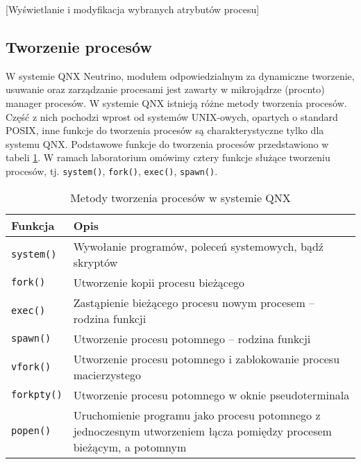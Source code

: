 \begin{example}{[Wyświetlanie i modyfikacja wybranych atrybutów procesu]}
  \label{ex:TEPBG}
  
\end{example}


\subsection{Tworzenie procesów}

W systemie QNX Neutrino, modułem odpowiedzialnym za dynamiczne tworzenie,
usuwanie oraz zarządzanie procesami jest zawarty w mikrojądrze (procnto)
manager procesów. W systemie QNX istnieją różne metody tworzenia procesów.
Część z nich pochodzi wprost od systemów UNIX-owych, opartych o standard POSIX,
inne funkcje do tworzenia procesów są charakterystyczne tylko dla systemu QNX.
Podstawowe funkcje do tworzenia procesów przedstawiono w tabeli
\ref{tab:IMJR3}. W ramach laboratorium omówimy cztery funkcje służące
tworzeniu procesów, tj. \texttt{system()}, \texttt{fork()}, \texttt{exec()},
\texttt{spawn()}.

\begin{table}[h!]
  \centering
  \caption{Metody tworzenia procesów w systemie QNX}
  \label{tab:IMJR3}
  \begin{tabular}{|l|p{}|}
    \hline
    \textbf{Funkcja}    & \textbf{Opis}  \\ \hline
    \texttt{system()}   & Wywołanie programów, poleceń systemowych, bądź skryptów \\ \hline
    \texttt{fork()}     & Utworzenie kopii procesu bieżącego \\ \hline
    \texttt{exec()}     & Zastąpienie bieżącego procesu nowym procesem -- rodzina funkcji \\ \hline
    \texttt{spawn()}    & Utworzenie procesu potomnego -- rodzina funkcji \\ \hline
    \texttt{vfork()}    & Utworzenie procesu potomnego i zablokowanie procesu macierzystego \\ \hline
    \texttt{forkpty()}  & Utworzenie procesu potomnego w oknie pseudoterminala \\ \hline
    \texttt{popen()}    & Uruchomienie programu jako procesu potomnego z
                          jednoczesnym utworzeniem łącza pomiędzy procesem
                          bieżącym, a potomnym \\ \hline
  \end{tabular}
\end{table}


